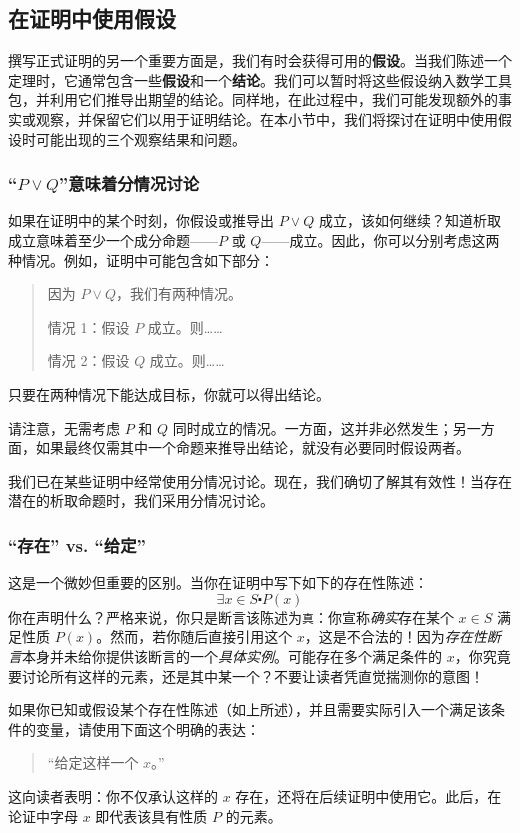 \subsection{在证明中使用假设}\label{sec:section4.9.8}

撰写正式证明的另一个重要方面是，我们有时会获得可用的\textbf{假设}。当我们陈述一个定理时，它通常包含一些\textbf{假设}和一个\textbf{结论}。我们可以暂时将这些假设纳入数学工具包，并利用它们推导出期望的结论。同样地，在此过程中，我们可能发现额外的事实或观察，并保留它们以用于证明结论。在本小节中，我们将探讨在证明中使用假设时可能出现的三个观察结果和问题。

\subsubsection*{``$P \lor Q$''意味着分情况讨论}

如果在证明中的某个时刻，你假设或推导出 $P \lor Q$ 成立，该如何继续？知道析取成立意味着至少一个成分命题——$P$ 或 $Q$——成立。因此，你可以分别考虑这两种情况。例如，证明中可能包含如下部分：
\begin{quote}
    因为 $P \lor Q$，我们有两种情况。

    \qquad 情况 1：假设 $P$ 成立。则……

    \qquad 情况 2：假设 $Q$ 成立。则……
\end{quote}
只要在两种情况下能达成目标，你就可以得出结论。

请注意，无需考虑 $P$ 和 $Q$ 同时成立的情况。一方面，这并非必然发生；另一方面，如果最终仅需其中一个命题来推导出结论，就没有必要同时假设两者。

我们已在某些证明中经常使用分情况讨论。现在，我们确切了解其有效性！当存在潜在的析取命题时，我们采用分情况讨论。

\subsubsection*{``存在'' vs. ``给定''}

这是一个微妙但重要的区别。当你在证明中写下如下的存在性陈述：
\[\exists x \in S \centerdot P(x)\]
你在声明什么？严格来说，你只是断言该陈述为\verb|真|：你宣称\emph{确实}存在某个 $x \in S$ 满足性质 $P(x)$。然而，若你随后直接引用这个 $x$，这是不合法的！因为\emph{存在性断言}本身并未给你提供该断言的一个\emph{具体实例}。可能存在多个满足条件的 $x$，你究竟要讨论所有这样的元素，还是其中某一个？不要让读者凭直觉揣测你的意图！

如果你已知或假设某个存在性陈述（如上所述），并且需要实际引入一个满足该条件的变量，请使用下面这个明确的表达：
\begin{quote}
    ``给定这样一个 $x$。''
\end{quote}
这向读者表明：你不仅承认这样的 $x$ 存在，还将在后续证明中使用它。此后，在论证中字母 $x$ 即代表该具有性质 $P$ 的元素。

